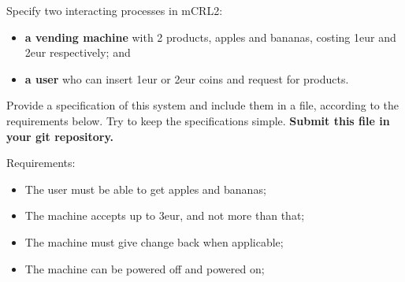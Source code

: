\documentclass[11pt]{article}
\begin{document}
\begin{myExercise} \label{ex:vm}
Specify two interacting processes in mCRL2:
\begin{itemize}
  \item \textbf{a vending machine} with 2 products, apples and bananas, costing 1eur and 2eur respectively; and
  \item \textbf{a user} who can insert 1eur or 2eur coins and request for products.
\end{itemize}

Provide a specification of this system and include them in a  file, according to the requirements below. Try to keep the specifications simple. \textbf{Submit this file in your git repository.}

Requirements:
\begin{itemize}
  \item The user must be able to get apples and bananas;
  \item The machine accepts up to 3eur, and not more than that;
  \item The machine must give change back when applicable;
  \item The machine can be powered off and powered on;
\end{itemize}

\end{myExercise}



\end{document}
